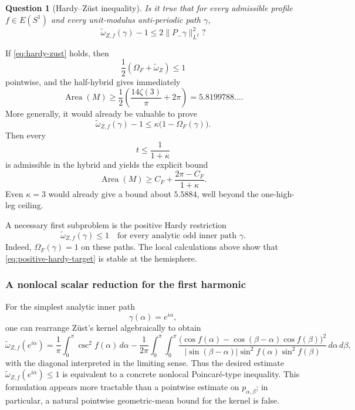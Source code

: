 \documentclass[11pt]{article}
\newtheorem{question}[theorem]{Question}
\newcommand{\Area}{\operatorname{Area}}
\begin{document}
\begin{question}[Hardy--Z\"ust inequality]\label{q:hardy-zust}
Is it true that for every admissible profile $f\in E(S^1)$ and every
unit-modulus anti-periodic path $\gamma$,
\begin{equation}\label{eq:hardy-zust}
 \boxed{
 \widetilde\omega_{Z,f}(\gamma)-1
 \le
 2\|P_-\gamma\|_{L^2}^2 ?}
\end{equation}
\end{question}

If \eqref{eq:hardy-zust} holds, then
\[
        \frac12(\Omega_F+\widetilde\omega_Z)\le1
\]
pointwise, and the half-hybrid gives immediately
\[
        \Area(M)
        \ge
        \frac12\left(
        \frac{14\zeta(3)}{\pi}+2\pi
        \right)
        =
        5.8199788\ldots.
\]
More generally, it would already be valuable to prove
\begin{equation}\label{eq:hardy-zust-kappa}
 \widetilde\omega_{Z,f}(\gamma)-1
 \le
 \kappa\bigl(1-\Omega_F(\gamma)\bigr).
\end{equation}
Then every
\[
        t\le\frac1{1+\kappa}
\]
is admissible in the hybrid and yields the explicit bound
\[
        \Area(M)
        \ge
        C_F+
        \frac{2\pi-C_F}{1+\kappa}.
\]
Even $\kappa=3$ would already give a bound about $5.5884$, well beyond
the one-high-leg ceiling.

A necessary first subproblem is the positive Hardy restriction
\begin{equation}\label{eq:positive-hardy-target}
 \boxed{
 \widetilde\omega_{Z,f}(\gamma)\le1
 \quad
 \text{for every analytic odd inner path }\gamma.}
\end{equation}
Indeed, $\Omega_F(\gamma)=1$ on these paths.  The local calculations above
show that \eqref{eq:positive-hardy-target} is stable at the hemisphere.

\subsubsection{A nonlocal scalar reduction for the first harmonic}

For the simplest analytic inner path
\[
        \gamma(\alpha)=e^{i\alpha},
\]
one can rearrange Z\"ust's kernel algebraically to obtain
\begin{equation}\label{eq:first-harmonic-nonlocal}
 \widetilde\omega_{Z,f}(e^{i\alpha})
 =
 \frac1\pi\int_0^\pi\csc^2f(\alpha)\,d\alpha
 -
 \frac1{2\pi}
 \int_0^\pi\int_0^\pi
 \frac{
 \bigl(
 \cos f(\alpha)
 -
 \cos(\beta-\alpha)\cos f(\beta)
 \bigr)^2
 }{
 |\sin(\beta-\alpha)|
 \sin^2f(\alpha)\sin^2f(\beta)
 }
 \,d\alpha\,d\beta ,
\end{equation}
with the diagonal interpreted in the limiting sense.
Thus the desired estimate
$\widetilde\omega_{Z,f}(e^{i\alpha})\le1$
is equivalent to a concrete nonlocal Poincar\'e-type inequality.  This
formulation appears more tractable than a pointwise estimate on
$p_{\alpha,\beta}$; in particular, a natural pointwise geometric-mean
bound for the kernel is false.
\end{document}
